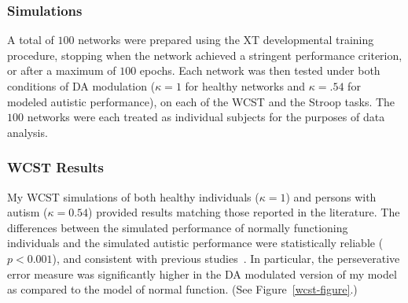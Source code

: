 \documentclass[man]{apa}
\begin{document}
\subsubsection{Simulations} 
A total of $100$ networks were prepared using the XT developmental
training procedure, stopping when the network achieved a stringent
performance criterion, or after a maximum of $100$ epochs.  Each
network was then tested under both conditions of DA modulation ($\kappa = 1$ for healthy networks and $\kappa = .54$ for modeled autistic performance), on
each of the WCST and the Stroop tasks.  The $100$ networks were each
treated as individual subjects for the purposes of data analysis.

\subsubsection{WCST Results} 
My WCST simulations of both healthy individuals ($\kappa = 1$) and persons with autism ($\kappa = 0.54$) 
provided results matching those reported in the literature.  The differences between the 
simulated performance of normally functioning individuals and the
simulated autistic performance were statistically reliable
($p < 0.001$), and consistent with previous
studies~\cite{PriorMR:1990:AutismWCST,Ozonoff:1999:AutismStroopWCST,MinshewNJ:2002:AutismWCST}.
In particular, the perseverative error measure was significantly
higher in the DA modulated version of my model as compared to the
model of normal function.  (See Figure~\ref{wcst-figure}.)
\end{document}

